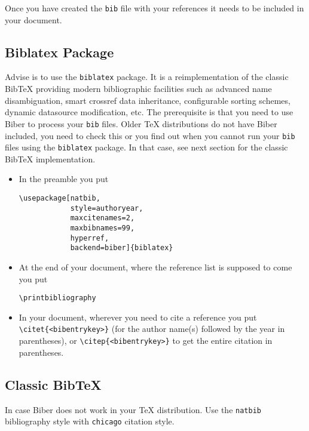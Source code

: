 \documentclass[a4paper,11pt]{article}
\theoremstyle{plain}
\theoremstyle{definition}
\begin{document}
Once you have created the
\texttt{bib} file with your references it needs to be included
in your document.

\subsection{Biblatex Package}
Advise is to use the \texttt{biblatex} package. It is a reimplementation of the
classic BibTeX providing modern bibliographic facilities such as
advanced name disambiguation, smart crossref data inheritance,
configurable sorting schemes, dynamic datasource modification, etc.
The prerequisite is that you need to use Biber to process your \texttt{bib}
files. Older TeX distributions do not have Biber included, you need to check this
or you find out when you cannot run your \texttt{bib} files using the
\texttt{biblatex} package.
In that case, see next section for the classic BibTeX implementation.

\begin{itemize}
\item
In the preamble you put

\begin{verbatim}
\usepackage[natbib,
            style=authoryear,
            maxcitenames=2,
            maxbibnames=99,
            hyperref,
            backend=biber]{biblatex}

\end{verbatim}

\item
At the end of your document, where the reference list is supposed to come you
put

\verb+\printbibliography+

\item
In your document, wherever you need
to cite a reference you put \verb+\citet{<bibentrykey>}+ (for the author name(s)
followed by the year in parentheses), or
\verb+\citep{<bibentrykey>}+
to get the entire citation in parentheses.
\end{itemize}

\subsection{Classic BibTeX}
In case Biber does not work in your TeX distribution.
Use the \texttt{natbib} bibliography style with \texttt{chicago} citation style.
\end{document}
